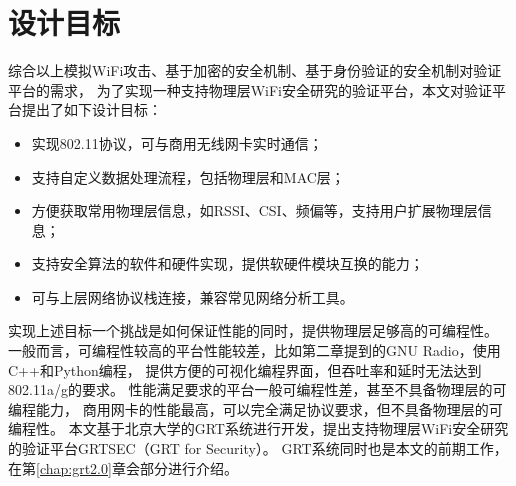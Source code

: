 	\section{设计目标}\label{sec:design_goal}
	综合以上模拟WiFi攻击、基于加密的安全机制、基于身份验证的安全机制对验证平台的需求，
	为了实现一种支持物理层WiFi安全研究的验证平台，本文对验证平台提出了如下设计目标：
	\begin{itemize}
		\item 实现802.11协议，可与商用无线网卡实时通信；
		\item 支持自定义数据处理流程，包括物理层和MAC层；
		\item 方便获取常用物理层信息，如RSSI、CSI、频偏等，支持用户扩展物理层信息；
		\item 支持安全算法的软件和硬件实现，提供软硬件模块互换的能力；
		\item 可与上层网络协议栈连接，兼容常见网络分析工具。
	\end{itemize}

	实现上述目标一个挑战是如何保证性能的同时，提供物理层足够高的可编程性。
	一般而言，可编程性较高的平台性能较差，比如第二章提到的GNU Radio，使用C++和Python编程，
	提供方便的可视化编程界面，但吞吐率和延时无法达到802.11a/g的要求。
	性能满足要求的平台一般可编程性差，甚至不具备物理层的可编程能力，
	商用网卡的性能最高，可以完全满足协议要求，但不具备物理层的可编程性。
	本文基于北京大学的GRT系统\cite{can14grt}进行开发，提出支持物理层WiFi安全研究的验证平台GRTSEC（GRT for Security）。
	GRT系统同时也是本文的前期工作，在第\ref{chap:grt2.0}章会部分进行介绍。
